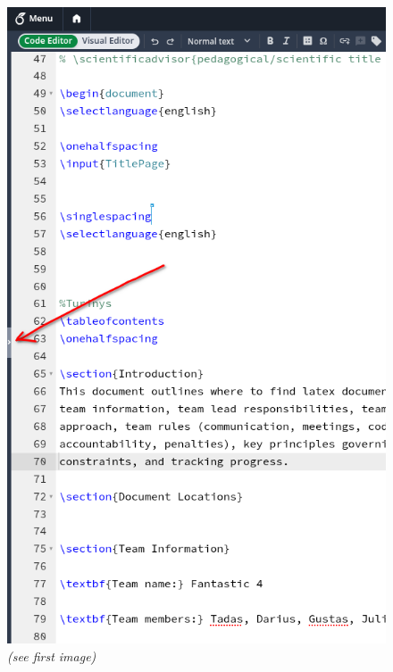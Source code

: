 \documentclass[]{VUMIFTemplateClass}
\begin{document}
\begin{figure}[H]
\centering
\begin{minipage}[t]{0.48\linewidth}
    \centering
    \includegraphics[height=0.45\textheight]{images/find_arrow.png}
    \\[6pt]
    \small\emph{(see first image)}
\end{minipage}\hfill
\begin{minipage}[t]{0.48\linewidth}
    \centering

\end{minipage}
\end{figure}
\end{document}
